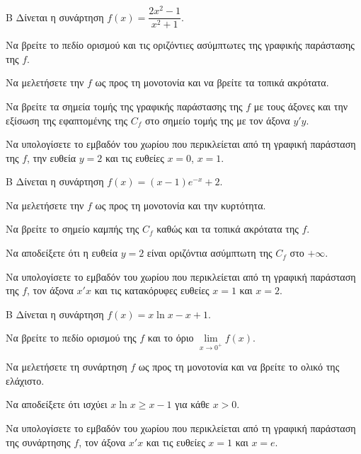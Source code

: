 \begin{thema}{Β}
Δίνεται η συνάρτηση $f(x) = \dfrac{2x^2-1}{x^2+1}$.
\begin{erwthma}
\item Να βρείτε το πεδίο ορισμού και τις οριζόντιες ασύμπτωτες της γραφικής παράστασης της $f$.
\item Να μελετήσετε την $f$ ως προς τη μονοτονία και να βρείτε τα τοπικά ακρότατα.
\item Να βρείτε τα σημεία τομής της γραφικής παράστασης της $f$ με τους άξονες και την εξίσωση της εφαπτομένης της $C_f$ στο σημείο τομής της με τον άξονα $y'y$.
\item Να υπολογίσετε το εμβαδόν του χωρίου που περικλείεται από τη γραφική παράσταση της $f$, την ευθεία $y=2$ και τις ευθείες $x=0$, $x=1$.
\end{erwthma}
\end{thema}

\begin{thema}{Β}
Δίνεται η συνάρτηση $f(x) = (x-1)e^{-x} + 2$.
\begin{erwthma}
\item Να μελετήσετε την $f$ ως προς τη μονοτονία και την κυρτότητα.
\item Να βρείτε το σημείο καμπής της $C_f$ καθώς και τα τοπικά ακρότατα της $f$.
\item Να αποδείξετε ότι η ευθεία $y = 2$ είναι οριζόντια ασύμπτωτη της $C_f$ στο $+\infty$.
\item Να υπολογίσετε το εμβαδόν του χωρίου που περικλείεται από τη γραφική παράσταση της $f$, τον άξονα $x'x$ και τις κατακόρυφες ευθείες $x=1$ και $x=2$.
\end{erwthma}
\end{thema}

\begin{thema}{Β}
Δίνεται η συνάρτηση $f(x) = x \ln x - x + 1$.
\begin{erwthma}
\item Να βρείτε το πεδίο ορισμού της $f$ και το όριο $\lim\limits_{x \to 0^+} f(x)$.
\item Να μελετήσετε τη συνάρτηση $f$ ως προς τη μονοτονία και να βρείτε το ολικό της ελάχιστο.
\item Να αποδείξετε ότι ισχύει $x \ln x \ge x - 1$ για κάθε $x > 0$.
\item Να υπολογίσετε το εμβαδόν του χωρίου που περικλείεται από τη γραφική παράσταση της συνάρτησης $f$, τον άξονα $x'x$ και τις ευθείες $x=1$ και $x=e$.
\end{erwthma}
\end{thema}

